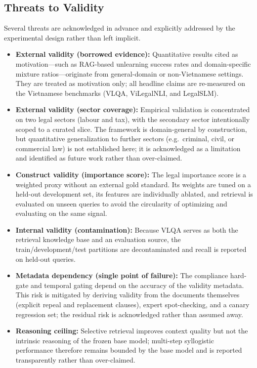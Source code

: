 \subsection{Threats to Validity}
Several threats are acknowledged in advance and explicitly addressed by the experimental design rather than left implicit.
\begin{itemize}
    \item \textbf{External validity (borrowed evidence):} Quantitative results cited as motivation---such as RAG-based unlearning success rates and domain-specific mixture ratios---originate from general-domain or non-Vietnamese settings. They are treated as motivation only; all headline claims are re-measured on the Vietnamese benchmarks (VLQA, ViLegalNLI, and LegalSLM).
    \item \textbf{External validity (sector coverage):} Empirical validation is concentrated on two legal sectors (labour and tax), with the secondary sector intentionally scoped to a curated slice. The framework is domain-general by construction, but quantitative generalization to further sectors (e.g.\ criminal, civil, or commercial law) is not established here; it is acknowledged as a limitation and identified as future work rather than over-claimed.
    \item \textbf{Construct validity (importance score):} The legal importance score is a weighted proxy without an external gold standard. Its weights are tuned on a held-out development set, its features are individually ablated, and retrieval is evaluated on unseen queries to avoid the circularity of optimizing and evaluating on the same signal.
    \item \textbf{Internal validity (contamination):} Because VLQA serves as both the retrieval knowledge base and an evaluation source, the train/development/test partitions are decontaminated and recall is reported on held-out queries.
    \item \textbf{Metadata dependency (single point of failure):} The compliance hard-gate and temporal gating depend on the accuracy of the validity metadata. This risk is mitigated by deriving validity from the documents themselves (explicit repeal and replacement clauses), expert spot-checking, and a canary regression set; the residual risk is acknowledged rather than assumed away.
    \item \textbf{Reasoning ceiling:} Selective retrieval improves context quality but not the intrinsic reasoning of the frozen base model; multi-step syllogistic performance therefore remains bounded by the base model and is reported transparently rather than over-claimed.
\end{itemize}
